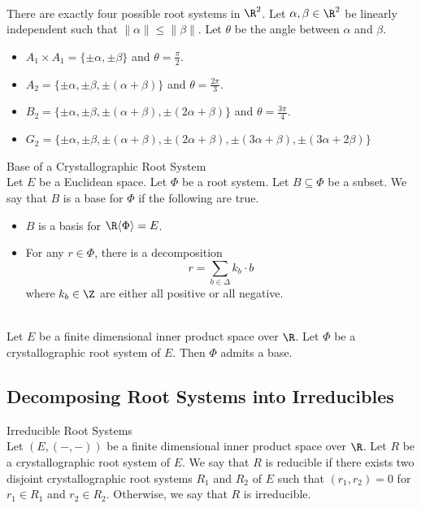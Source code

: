 \documentclass[a4paper]{article}
\begin{document}
\begin{eg}{}{} \\There are exactly four possible root systems in $\R^2$. Let $\alpha,\beta\in\R^2$ be linearly independent such that $\|\alpha\|\leq\|\beta\|$. Let $\theta$ be the angle between $\alpha$ and $\beta$. 
\begin{itemize}
\item $A_1\times A_1=\{\pm\alpha,\pm\beta\}$ and $\theta=\frac{\pi}{2}$. 
\item $A_2=\{\pm\alpha,\pm\beta,\pm(\alpha+\beta)\}$ and $\theta=\frac{2\pi}{3}$. 
\item $B_2=\{\pm\alpha,\pm\beta,\pm(\alpha+\beta),\pm(2\alpha+\beta)\}$ and $\theta=\frac{3\pi}{4}$. 
\item $G_2=\{\pm\alpha,\pm\beta,\pm(\alpha+\beta),\pm(2\alpha+\beta),\pm(3\alpha+\beta),\pm(3\alpha+2\beta)\}$
\end{itemize}
\end{eg}

\begin{defn}{Base of a Crystallographic Root System}{}\\
Let $E$ be a Euclidean space. Let $\Phi$ be a root system. Let $B\subseteq\Phi$ be a subset. We say that $B$ is a base for $\Phi$ if the following are true. 
\begin{itemize}
\item $B$ is a basis for $\R\langle\Phi\rangle=E$. 
\item For any $r\in\Phi$, there is a decomposition $$r=\sum_{b\in\Delta}k_b\cdot b$$ where $k_b\in\Z$ are either all positive or all negative. 
\end{itemize}
\end{defn}

\begin{prp}{}{}\\
Let $E$ be a finite dimensional inner product space over $\R$. Let $\Phi$ be a crystallographic root system of $E$. Then $\Phi$ admits a base. 
\end{prp}

\subsection{Decomposing Root Systems into Irreducibles}
\begin{defn}{Irreducible Root Systems}{} \\Let $(E,(-,-))$ be a finite dimensional inner product space over $\R$. Let $R$ be a crystallographic root system of $E$. We say that $R$ is reducible if there exists two disjoint crystallographic root systems $R_1$ and $R_2$ of $E$ such that $(r_1,r_2)=0$ for $r_1\in R_1$ and $r_2\in R_2$. Otherwise, we say that $R$ is irreducible. 
\end{defn}
\end{document}
